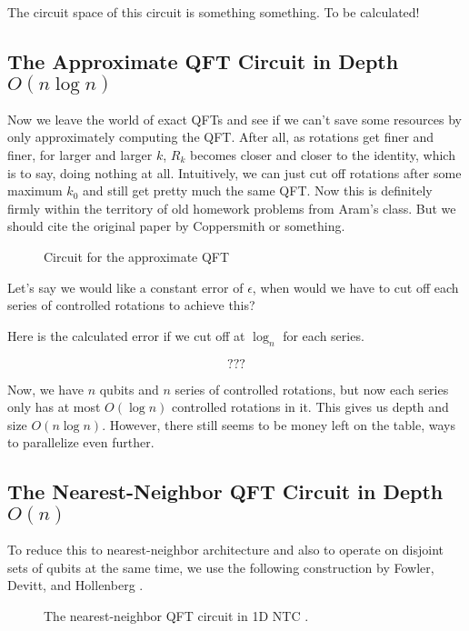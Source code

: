 The circuit space of this circuit is something something. To be calculated!

\subsection{The Approximate QFT Circuit in Depth $O(n\log n)$}

Now we leave the world of exact QFTs and see if we can't save some
resources by only approximately computing the QFT. After all, as rotations
get finer and finer, for larger and larger $k$, $R_k$ becomes closer and closer
to the identity, which is to say, doing nothing at all. Intuitively, we can
just cut off rotations after some maximum $k_0$ and still get pretty much
the same QFT. Now this is definitely firmly within the territory of old
homework problems from Aram's class. But we should cite the original paper
by Coppersmith or something.

\begin{figure}
\label{fig:qft-approx}
\caption{Circuit for the approximate QFT}
\end{figure}

Let's say we would like a constant error of $\epsilon$, when would we have
to cut off each series of controlled rotations to achieve this?

Here is the calculated error if we cut off at $\log_n$ for each series.

\begin{equation}
???
\end{equation}

Now, we have $n$ qubits and $n$ series of controlled rotations, but now each
series only has at most $O(\log n)$ controlled rotations in it.
This gives us depth and size $O(n \log n)$. However, there still seems to
be money left on the table, ways to parallelize even further.

\subsection{The Nearest-Neighbor QFT Circuit in Depth $O(n)$}

To reduce this to nearest-neighbor architecture and also to operate on
disjoint sets of qubits at the same time, we use the following
construction by Fowler, Devitt, and Hollenberg \cite{Fowler2006}.

\begin{figure}
\label{fig:qft-fdh}
\caption{The nearest-neighbor QFT circuit in 1D NTC \cite{Fowler2006}.}
\end{figure}

